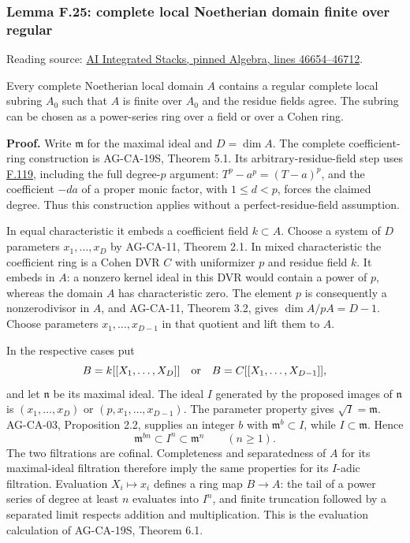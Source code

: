 \documentclass[11pt,a4paper,openany]{report}
\begin{document}
\label{AG-RG-S05-algebra-lemma-complete-local-Noetherian-domain-finite-over-regular}

\subsubsection{Lemma F.25: complete local Noetherian domain finite over regular}\label{AG-RG-S05-lemma-f.25-complete-local-noetherian-domain-finite-over-regular}

Reading source: \href{https://github.com/KokunoYumeto/unofficial-stacks-project-ai-drafts/blob/565b10e987aba5969b21145a0833f42d69f96790/algebra.tex\#L46654-L46712}{AI Integrated Stacks, pinned Algebra, lines 46654--46712}.

Every complete Noetherian local domain \(A\) contains a regular complete local subring \(A_0\) such that \(A\) is finite over \(A_0\) and the residue fields agree. The subring can be chosen as a power-series ring over a field or over a Cohen ring.

\textbf{Proof.} Write \(\mathfrak m\) for the maximal ideal and \(D=\dim A\). The complete coefficient-ring construction is AG-CA-19S, Theorem 5.1. Its arbitrary-residue-field step uses \hyperref[AG-RG-S05-more-algebra-lemma-p-basis]{F.119}, including the full degree-\(p\) argument: \(T^p-a^p=(T-a)^p\), and the coefficient \(-da\) of a proper monic factor, with \(1\leq d<p\), forces the claimed degree. Thus this construction applies without a perfect-residue-field assumption.

In equal characteristic it embeds a coefficient field \(k\subset A\). Choose a system of \(D\) parameters \(x_1,\ldots,x_D\) by AG-CA-11, Theorem 2.1. In mixed characteristic the coefficient ring is a Cohen DVR \(C\) with uniformizer \(p\) and residue field \(k\). It embeds in \(A\): a nonzero kernel ideal in this DVR would contain a power of \(p\), whereas the domain \(A\) has characteristic zero. The element \(p\) is consequently a nonzerodivisor in \(A\), and AG-CA-11, Theorem 3.2, gives \(\dim A/pA=D-1\). Choose parameters \(x_1,\ldots,x_{D-1}\) in that quotient and lift them to \(A\).

In the respective cases put \[B=k[[X_1,\ldots,X_D]]
\quad\hbox{or}\quad
B=C[[X_1,\ldots,X_{D-1}]],\] and let \(\mathfrak n\) be its maximal ideal. The ideal \(I\) generated by the proposed images of \(\mathfrak n\) is \((x_1,\ldots,x_D)\) or \((p,x_1,\ldots,x_{D-1})\). The parameter property gives \(\sqrt I=\mathfrak m\). AG-CA-03, Proposition 2.2, supplies an integer \(b\) with \(\mathfrak m^b\subset I\), while \(I\subset\mathfrak m\). Hence \[\mathfrak m^{bn}\subset I^n\subset\mathfrak m^n\qquad(n\geq1).\] The two filtrations are cofinal. Completeness and separatedness of \(A\) for its maximal-ideal filtration therefore imply the same properties for its \(I\)-adic filtration. Evaluation \(X_i\mapsto x_i\) defines a ring map \(B\to A\): the tail of a power series of degree at least \(n\) evaluates into \(I^n\), and finite truncation followed by a separated limit respects addition and multiplication. This is the evaluation calculation of AG-CA-19S, Theorem 6.1.
\end{document}
